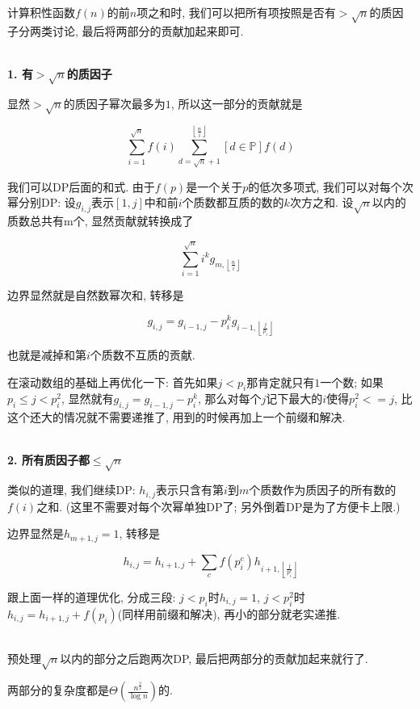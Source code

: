 计算积性函数$f(n)$的前$n$项之和时, 我们可以把所有项按照是否有$> \sqrt n$的质因子分两类讨论, 最后将两部分的贡献加起来即可.

~\\

\textbf{1. 有$> \sqrt n$的质因子}

显然$> \sqrt n$的质因子幂次最多为$1$, 所以这一部分的贡献就是

$$ \sum_{i = 1} ^ {\sqrt n} f(i) \sum_{d = \sqrt n + 1} ^ {\left\lfloor \frac n i \right\rfloor} \left[ d \in \mathbb{P} \right] f(d) $$

我们可以DP后面的和式. 由于$f(p)$是一个关于$p$的低次多项式, 我们可以对每个次幂分别DP: 设$g_{i, j}$表示$[1, j]$中和前$i$个质数都互质的数的$k$次方之和. 设$\sqrt n$以内的质数总共有m个, 显然贡献就转换成了

$$ \sum_{i = 1} ^ {\sqrt n} i ^ k g_{m, \left\lfloor \frac n i \right\rfloor} $$

边界显然就是自然数幂次和, 转移是

$$ g_{i, j} = g_{i - 1, j} - p_i ^ k g_{i - 1, \left\lfloor \frac j {p_i} \right\rfloor} $$

也就是减掉和第$i$个质数不互质的贡献.

在滚动数组的基础上再优化一下: 首先如果$j < p_i$那肯定就只有$1$一个数; 如果$p_i \le j < p_i ^ 2$, 显然就有$g_{i, j} = g_{i - 1, j} - p_i ^ k$, 那么对每个$j$记下最大的$i$使得$p_i ^ 2 <= j$, 比这个还大的情况就不需要递推了, 用到的时候再加上一个前缀和解决.

~\\

\textbf{2. 所有质因子都$\le \sqrt n$}

类似的道理, 我们继续DP: $h_{i, j}$表示只含有第$i$到$m$个质数作为质因子的所有数的$f(i)$之和. (这里不需要对每个次幂单独DP了; 另外倒着DP是为了方便卡上限.)

边界显然是$h_{m + 1, j} = 1$, 转移是

$$ h_{i, j} = h_{i + 1, j} + \sum_{c} f(p_i ^ c) h_{i + 1, \left\lfloor \frac j {p_i ^ c} \right\rfloor} $$

跟上面一样的道理优化, 分成三段: $j < p_i$时$h_{i, j} = 1$, $j < p_i ^ 2$时$h_{i, j} = h_{i + 1, j} + f(p_i)$(同样用前缀和解决), 再小的部分就老实递推.

~\\

预处理$\sqrt n$以内的部分之后跑两次DP, 最后把两部分的贡献加起来就行了.

两部分的复杂度都是$\Theta \left( \frac {n ^ {\frac 3 4}} {\log n} \right)$的.